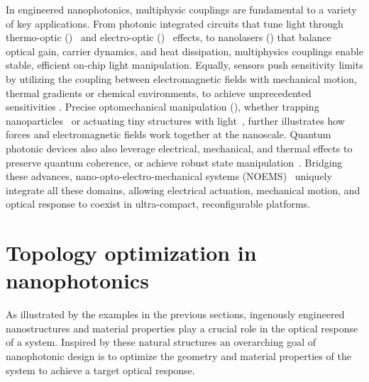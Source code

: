 In engineered nanophotonics, multiphysic couplings are fundamental to a variety of key applications. From photonic integrated circuits that tune light through  
thermo-optic ()~\cite{TOPS_1, TOPS_2, TOPS_3, program, PIC} and electro-optic ()~\cite{modu, modu1, modu2, pockels} effects, to nanolasers () that balance optical gain, carrier dynamics, and heat dissipation\cite{laser,laser_pic}, multiphysics couplings enable stable, efficient on-chip light manipulation. Equally, sensors  
push sensitivity limits by utilizing the coupling between electromagnetic fields with mechanical motion, thermal gradients or chemical environments, to achieve unprecedented sensitivities \cite{therm_sensing,sensing, weakforce}.
Precise optomechanical manipulation (), whether trapping nanoparticles~\cite{ashkin_acceleration_1970} or actuating tiny structures with light~\cite{ivanyi_optically_2024}, further illustrates how forces and electromagnetic fields work together at the nanoscale. Quantum photonic devices also
also leverage electrical, mechanical, and thermal effects to preserve quantum coherence, or achieve robust state manipulation~\cite{quant_eo, Andrews_2014, Xi_2025}. Bridging these advances, nano-opto-electro-mechanical systems (NOEMS)~\cite{NOEMS} uniquely integrate all these  
domains, allowing electrical actuation, mechanical motion, and optical response to coexist in ultra-compact, reconfigurable platforms. 



\section{Topology optimization in nanophotonics}

As illustrated by the examples in the previous sections, ingenously engineered nanostructures and material properties play a crucial role in the
optical response of a system. Inspired by these natural structures an overarching goal of nanophotonic
design is to optimize the geometry and material properties of the system to achieve a target
optical response.

